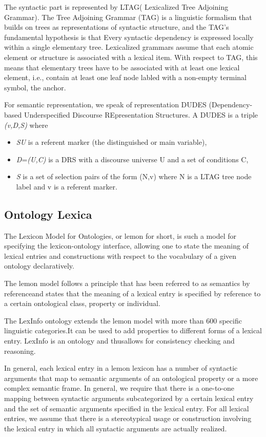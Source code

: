 The syntactic part is represented by LTAG( Lexicalized Tree Adjoining Grammar).  
The Tree Adjoining Grammar (TAG) is a linguistic formalism that builds on trees as representations of syntactic structure, and the TAG's fundamental hypothesis is that Every syntactic dependency is expressed locally within a single elementary tree. Lexicalized grammars assume that each atomic element or structure is associated with a lexical item. With respect to TAG, this means that elementary trees have to be associated with at least one lexical element, i.e., contain at least one leaf node labled with a non-empty terminal symbol, the anchor.

For semantic representation, we speak of representation DUDES (Dependency-based Underspecified Discourse REpresentation Structures.
A DUDES is a triple  \textit{(v,D,S)} where 
\begin{itemize} 
  \item  \textit{S}\epsilon\textit{U} is a referent marker (the distinguished or main variable),
  \item \textit{D}=\textit{(U,C)} is a DRS with a discourse universe U and a set of conditions C, 
  \item  \textit{S} is a set of selection pairs of the form (N,v) where N is a LTAG tree node label and v is
a referent marker.
\end{itemize} 

\subsection{Ontology Lexica}
The Lexicon Model for Ontologies, or lemon for short, is such a model for specifying the lexicon-ontology interface, allowing one to state the meaning of lexical entries and constructions with respect to the vocabulary of a given ontology declaratively.

The lemon model follows a principle that has been referred to as semantics by referenceand states that the meaning of a lexical entry is specified by reference to a certain ontological class, property or individual.

The LexInfo ontology extends the lemon model with more than 600 specific linguistic categories.It can be used to add properties to different forms of a lexical entry. LexInfo is an ontology and thusallows for consistency checking and reasoning. 

In general, each lexical entry in a lemon lexicon has a number of syntactic arguments that map to semantic arguments of an ontological property or a more complex semantic frame. In general, we require that there is a one-to-one mapping between syntactic arguments subcategorized by a certain lexical entry and the set of semantic arguments specified in the lexical entry. For all lexical entries, we assume that there is a stereotypical usage or construction involving the lexical entry in which all syntactic arguments are actually realized.
